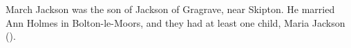 
March Jackson was the son of Jackson of Gragrave, near Skipton.  He married Ann Holmes in Bolton-le-Moors, and they had at least one child, Maria Jackson ().

